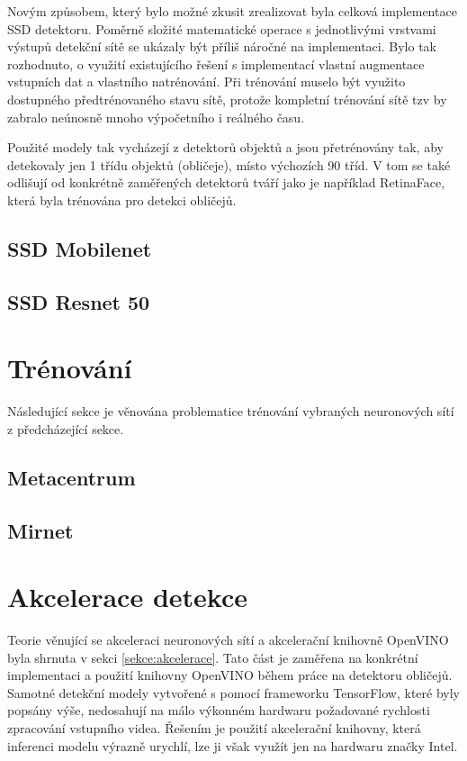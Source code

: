 Novým způsobem, který bylo možné zkusit zrealizovat byla celková implementace SSD detektoru. Poměrně složité matematické operace s jednotlivými vrstvami výstupů detekční sítě se ukázaly být příliš náročné na implementaci. Bylo tak rozhodnuto, o využití existujícího řešení s implementací vlastní augmentace vstupních dat a vlastního natrénování. Při trénování muselo být využito dostupného předtrénovaného stavu sítě, protože kompletní trénování sítě tzv  by zabralo neúnosně mnoho výpočetního i reálného času.

Použité modely tak vycházejí z detektorů objektů a jsou přetrénovány tak, aby detekovaly jen 1 třídu objektů (obličeje), místo výchozích 90 tříd. V tom se také odlišují od konkrétně zaměřených detektorů tváří jako je například RetinaFace, která byla trénována pro detekci obličejů.

\subsection*{SSD Mobilenet}

\subsection*{SSD Resnet 50}

\section{Trénování}
\label{sekce:trenovani}
Následující sekce je věnována problematice trénování vybraných neuronových sítí z předcházející sekce.

\subsection*{Metacentrum}

\subsection*{Mirnet}


\section{Akcelerace detekce}
\label{sekce:akcelerace_implementace}
Teorie věnující se akceleraci neuronových sítí a akcelerační knihovně OpenVINO byla shrnuta v sekci \ref{sekce:akcelerace}. Tato část je zaměřena na konkrétní implementaci a použití knihovny OpenVINO během práce na detektoru obličejů. Samotné detekční modely vytvořené s pomocí frameworku TensorFlow, které byly popsány výše, nedosahují na málo výkonném hardwaru požadované rychlosti zpracování vstupního videa. Řešením je použití akcelerační knihovny, která inferenci modelu výrazně urychlí, lze ji však využít jen na hardwaru značky Intel.

